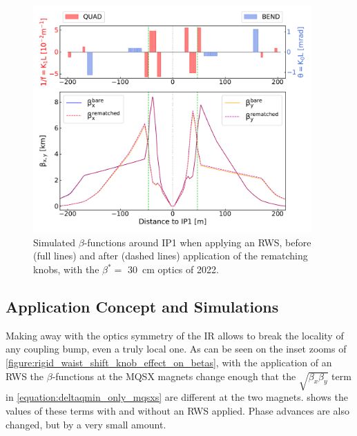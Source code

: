 \begin{figure}[!htb]
    \centering
    \includegraphics[width=0.95\textwidth]{Figures/IR_Coupling_Correction/rws_ir1_rematching.pdf}
    \caption{Simulated \(\beta\)-functions around IP\num{1} when applying an RWS, before (full lines) and after (dashed lines) application of the rematching knobs, with the \(\beta^{\ast} =\) \qty{30}{\centi\metre} optics of \num{2022}.}
    \label{figure:rws_ir1_rematching_betas}
\end{figure}

\subsection{Application Concept and Simulations}
\label{subsection:rws_application_and_simulations}

Making away with the optics symmetry of the IR allows to break the locality of any coupling bump, even a truly local one.
As can be seen on the inset zooms of \cref{figure:rigid_waist_shift_knob_effect_on_betas}, with the application of an RWS the \(\beta\)-functions at the MQSX magnets change enough that the \(\sqrt{\beta_x \beta_y}\) term in \cref{equation:deltaqmin_only_mqsxs} are different at the two magnets.
 shows the values of these terms with and without an RWS applied.
Phase advances are also changed, but by a very small amount.

